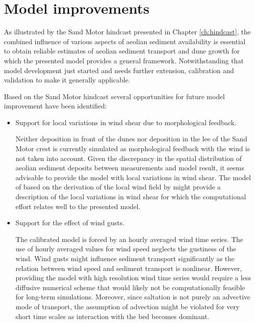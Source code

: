 \section{Model improvements}

As illustrated by the Sand Motor hindcast presented in Chapter
\ref{ch:hindcast}, the combined influence of various aspects of
aeolian sediment availability is essential to obtain reliable
estimates of aeolian sediment transport and dune growth for which the
presented model provides a general framework. Notwithstanding that
model development just started and needs further extension,
calibration and validation to make it generally applicable.

Based on the Sand Motor hindcast several opportunities for future
model improvement have been identified:

\begin{itemize}
\item Support for local variations in wind shear due to morphological
  feedback.

  Neither deposition in front of the dunes nor deposition in the lee
  of the Sand Motor crest is currently simulated as morphological
  feedback with the wind is not taken into account. Given the
  discrepancy in the spatial distribution of aeolian sediment deposits
  between measurements and model result, it seems advisable to provide
  the model with local variations in wind shear. The model of
  \cite{Kroy2002} based on the derivation of the local wind field by
  \citet{Weng1991} might provide a description of the local variations
  in wind shear for which the computational effort relates well to the
  presented model.

%

\item Support for the effect of wind gusts.

  The calibrated model is forced by an hourly averaged wind time
  series. The use of hourly averaged values for wind speed neglects
  the gustiness of the wind. Wind gusts might influence sediment
  transport significantly as the relation between wind speed and
  sediment transport is nonlinear. However, providing the model with
  high resolution wind time series would require a less diffusive
  numerical scheme that would likely not be computationally feasible
  for long-term simulations. Moreover, since saltation is not purely
  an advective mode of transport, the assumption of advection might be
  violated for very short time scales as interaction with the bed
  becomes dominant.


\end{itemize}
